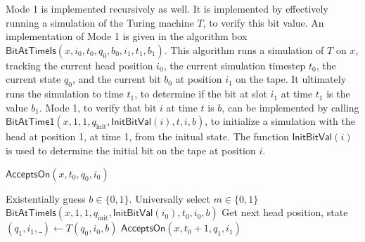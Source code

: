 \documentclass{article}
\begin{document}
Mode 1 is implemented recursively as well.
It is implemented by effectively running a simulation of the Turing machine $T$, to verify this bit value.
An implementation of Mode 1 is given in the algorithm box $\mathsf{BitAtTimeIs}(x, i_0, t_0, q_0, b_0, i_1, t_1, b_1)$.
This algorithm runs a simulation of $T$ on $x$, tracking the current head position $i_0$, the current simulation timestep $t_0$, the current state $q_0$, and the current bit $b_0$ at position $i_1$ on the tape.
It ultimately runs the simulation to time $t_1$, to determine if the bit at slot $i_1$ at time $t_1$ is the value $b_1$.
Mode 1, to verify that bit $i$ at time $t$ is $b$, can be implemented by calling $\mathsf{BitAtTime1}(x, 1, 1, q_\text{init}, \mathsf{InitBitVal}(i), t, i, b)$, to initialize a simulation with the head at position 1, at time 1, from the initual state.  The function $\mathsf{InitBitVal}(i)$ is used to determine the initial bit on the tape at position $i$.

\begin{algorithm}{$\mathsf{AcceptsOn}(x, t_0, q_0, i_0)$}
\begin{algorithmic}
\STATE {}
\ELSE
\STATE Existentially guess $b \in \{0, 1\}$.
\STATE Universally select $m \in \{0, 1\}$
\RETURN $\mathsf{BitAtTimeIs}(x, 1, 1, q_\text{init}, \mathsf{InitBitVal}(i_0), t_0, i_0, b)$
\ELSE
\STATE Get next head position, state $(q_1, i_1, \_) \gets T(q_0, i_0, b)$
\RETURN $\mathsf{AcceptsOn}(x, t_0 + 1, q_1, i_1)$
\ENDIF
\ENDIF
\end{algorithmic}
\end{algorithm}
\end{document}
